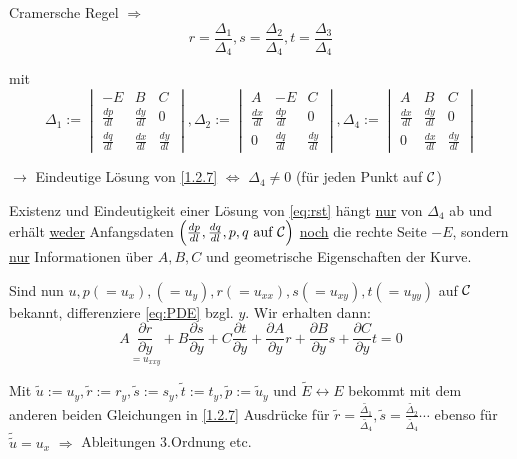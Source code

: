 Cramersche Regel $\Rightarrow$
\begin{equation}
    r= \frac{\Delta_1}{\Delta_4}, s=\frac{\Delta_2}{\Delta_4}, t=\frac{\Delta_3}{\Delta_4}
    \label{}
\end{equation}

mit 
\[
    \Delta_1 :=
    \begin{vmatrix} -E & B & C \\
        \frac{dp}{dl} & \frac{dy}{dl} & 0 \\
        \frac{dq}{dl} & \frac{dx}{dl} & \frac{dy}{dl}
    \end{vmatrix}
%
    ,\Delta_2 :=
    \begin{vmatrix} A & -E & C \\
        \frac{dx}{dl} & \frac{dp}{dl} & 0 \\
        0 & \frac{dq}{dl} & \frac{dy}{dl}
    \end{vmatrix}
%
    ,\Delta_4 :=
    \begin{vmatrix} A & B & C \\
        \frac{dx}{dl} & \frac{dy}{dl} & 0 \\
        0 & \frac{dx}{dl} & \frac{dy}{dl}
    \end{vmatrix}
\]

$\to$ Eindeutige Lösung von \ref{1.2.7} $\Leftrightarrow$ $\Delta_4 \neq 0$ (für jeden Punkt auf $\mathcal{C}$)

\begin{bemerkung} %
    Existenz und Eindeutigkeit einer Lösung von \eqref{eq:rst} hängt \underline{nur} von $\Delta_4$ ab und erhält \underline{weder} Anfangsdaten $\left( \frac{dp}{dl}, \frac{dq}{dl}, p, q \text{ auf } \mathcal{C} \right)$ \underline{noch} die rechte Seite $-E$, sondern \underline{nur} Informationen über $A,B,C$ und geometrische Eigenschaften der Kurve.\\
\end{bemerkung}

Sind nun $u, p(=u_x), (=u_y), r(=u_{xx}), s(=u_{xy}), t(=u_{yy})$ auf $\mathcal{C}$ bekannt, differenziere \eqref{eq:PDE} bzgl. $y$. Wir erhalten dann:
\[
    A \underset{=u_{xxy}}{\frac{\partial r}{\partial y}} + B \frac{\partial s}{\partial y} + C \frac{\partial t}{\partial y} + \frac{\partial A}{\partial y} r + \frac{\partial B}{\partial y} s + \frac{\partial C}{\partial y} t = 0
\]

Mit $\tilde{u} := u_y, \tilde{r} := r_y, \tilde{s}:=s_y, \tilde{t}:=t_y, \tilde{p}:=\tilde{u}_y$ und $\tilde{E} \leftrightarrow E$ bekommt mit dem anderen beiden Gleichungen in \ref{1.2.7} Ausdrücke für $\tilde{r}=\frac{\tilde{\Delta_1}}{\tilde{\Delta_4}}, \tilde{s} = \frac{\tilde{\Delta_2}}{\tilde{\Delta_4}}\cdots$ ebenso für $\tilde{\tilde{u}} = u_x$ $\Rightarrow$ Ableitungen 3.Ordnung etc.

